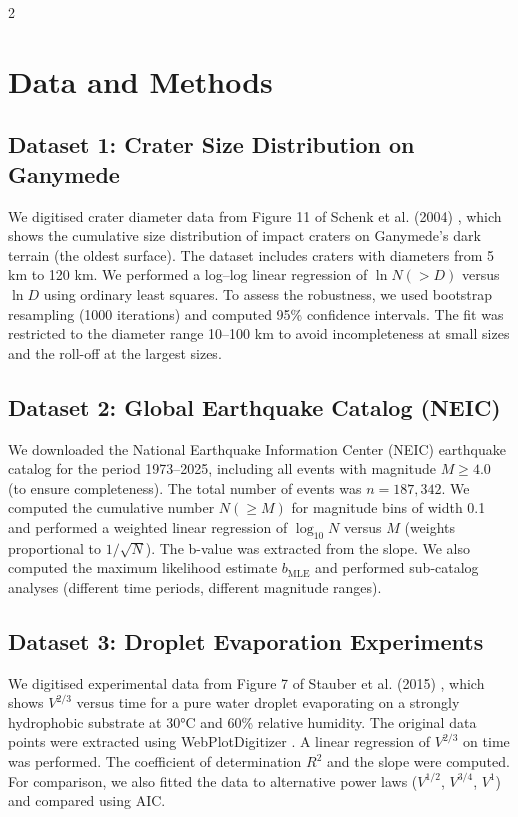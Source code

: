 \documentclass[11pt,a4paper]{article}
\begin{document}
\begin{multicols}{2}
		\section{Data and Methods}
		
		\subsection{Dataset 1: Crater Size Distribution on Ganymede}
		
		We digitised crater diameter data from Figure 11 of Schenk et al. (2004) \cite{Schenk2004}, which shows the cumulative size distribution of impact craters on Ganymede’s dark terrain (the oldest surface). The dataset includes craters with diameters from 5 km to 120 km. We performed a log–log linear regression of \(\ln N(>D)\) versus \(\ln D\) using ordinary least squares. To assess the robustness, we used bootstrap resampling (1000 iterations) and computed 95\% confidence intervals. The fit was restricted to the diameter range 10–100 km to avoid incompleteness at small sizes and the roll-off at the largest sizes.
		
		\subsection{Dataset 2: Global Earthquake Catalog (NEIC)}
		
		We downloaded the National Earthquake Information Center (NEIC) earthquake catalog \cite{USGSNEIC} for the period 1973–2025, including all events with magnitude \(M \ge 4.0\) (to ensure completeness). The total number of events was \(n = 187,342\). We computed the cumulative number \(N(\ge M)\) for magnitude bins of width 0.1 and performed a weighted linear regression of \(\log_{10} N\) versus \(M\) (weights proportional to \(1/\sqrt{N}\)). The b-value was extracted from the slope. We also computed the maximum likelihood estimate \(b_{\text{MLE}}\) \cite{Aki1965} and performed sub-catalog analyses (different time periods, different magnitude ranges).
		
		\subsection{Dataset 3: Droplet Evaporation Experiments}
		
		We digitised experimental data from Figure 7 of Stauber et al. (2015) \cite{Stauber2015}, which shows \(V^{2/3}\) versus time for a pure water droplet evaporating on a strongly hydrophobic substrate at 30°C and 60\% relative humidity. The original data points were extracted using WebPlotDigitizer \cite{WebPlotDigitizer}. A linear regression of \(V^{2/3}\) on time was performed. The coefficient of determination \(R^2\) and the slope were computed. For comparison, we also fitted the data to alternative power laws (\(V^{1/2}\), \(V^{3/4}\), \(V^{1}\)) and compared using AIC.
		

\end{multicols}
\end{document}
